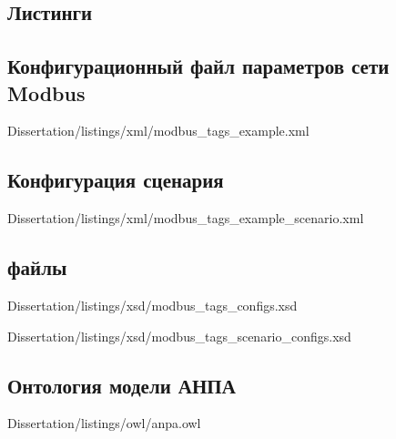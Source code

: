 \begin{landscape}
\chapter{Листинги}
\section{Конфигурационный файл параметров сети Modbus}\label{app:sec:modbus_tag}
    
            {Dissertation/listings/xml/modbus_tags_example.xml}
\end{landscape}

\section{Конфигурация сценария}\label{app:sec:modbus_scenario_example_diagram}

        {Dissertation/listings/xml/modbus_tags_example_scenario.xml}

\begin{landscape}
\section{ файлы}\label{app:sec:xsd}
    
            {Dissertation/listings/xsd/modbus_tags_configs.xsd}
    
    
            {Dissertation/listings/xsd/modbus_tags_scenario_configs.xsd}        
\end{landscape}

\section{Онтология модели АНПА}\label{app:sec:anpa_owl}

        {Dissertation/listings/owl/anpa.owl}


